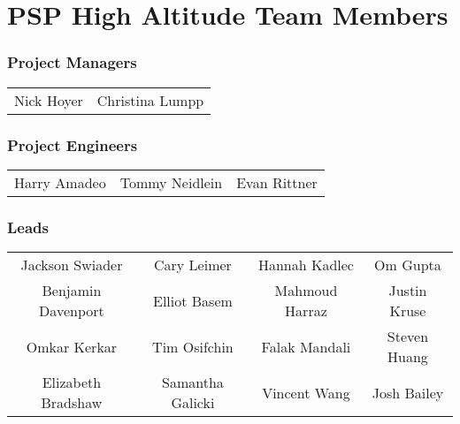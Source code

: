 \section{PSP High Altitude Team Members}

\subsubsection*{Project Managers}
\begin{table*}[htbp!]\small
    \centering
    \begin{tabular}{cc}
        Nick Hoyer & Christina Lumpp
    \end{tabular}
\end{table*}

\subsubsection*{Project Engineers}
\begin{table*}[htbp!]\small
    \centering
    \begin{tabular}{ccc}
        Harry Amadeo & Tommy Neidlein & Evan Rittner
    \end{tabular}
\end{table*}

\subsubsection*{Leads}
\begin{table*}[htbp!]\small
    \centering
    \begin{tabular}{cccc}
        Jackson Swiader & Cary Leimer & Hannah Kadlec & Om Gupta \\
        Benjamin Davenport & Elliot Basem & Mahmoud Harraz & Justin Kruse \\
        Omkar Kerkar & Tim Osifchin & Falak Mandali & Steven Huang \\
        Elizabeth Bradshaw & Samantha Galicki & Vincent Wang & Josh Bailey
    \end{tabular}
\end{table*}

